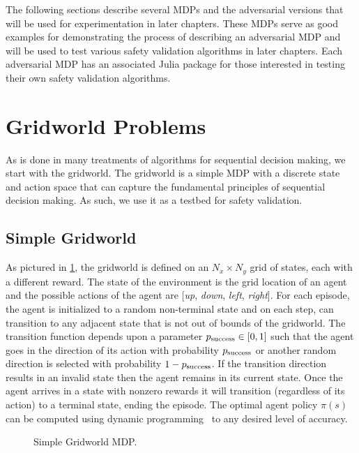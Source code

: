 The following sections describe several MDPs and the adversarial versions that will be used for experimentation in later chapters. These MDPs serve as good examples for demonstrating the process of describing an adversarial MDP and will be used to test various safety validation algorithms in later chapters. Each adversarial MDP has an associated Julia package for those interested in testing their own safety validation algorithms. 

\section{Gridworld Problems}
As is done in many treatments of algorithms for sequential decision making, we start with the gridworld. The gridworld is a simple MDP with a discrete state and action space that can capture the fundamental principles of sequential decision making. As such, we use it as a testbed for safety validation.

\subsection{Simple Gridworld}
As pictured in \cref{fig:simple_gridworld}, the gridworld is defined on an $N_x \times N_y$ grid of states, each with a different reward.  The state of the environment is the grid location of an agent and the possible actions of the agent are [\emph{up}, \emph{down}, \emph{left}, \emph{right}]. For each episode, the agent is initialized to a random non-terminal state and on each step, can transition to any adjacent state that is not out of bounds of the gridworld. The transition function depends upon a parameter $p_{\rm success} \in [0,1]$ such that the agent goes in the direction of its action with probability $p_{\rm success}$ or another random direction is selected with probability $1-p_{\rm success}$. If the transition direction results in an invalid state then the agent remains in its current state. Once the agent arrives in a state with nonzero rewards it will transition (regardless of its action) to a terminal state, ending the episode. The optimal agent policy $\pi(s)$ can be computed using dynamic programming~\cite{dmubook} to any desired level of accuracy. 

\begin{figure}
    \centering
    \small
    
    \caption{Simple Gridworld MDP.}
    \label{fig:simple_gridworld}
\end{figure}

